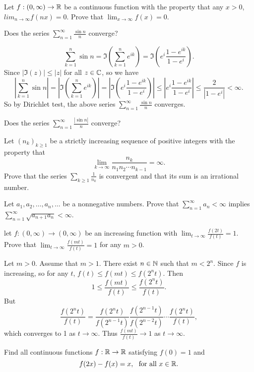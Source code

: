 \question[P\&B, 351] Let $f:(0,\infty)\to\mathbb{R}$ be a continuous function with the property that any $x>0$, $lim_{n\to\infty}{f(nx)}=0$. Prove that $\lim_{x\to\infty}{f(x)}=0$.

\question Does the series $\sum_{n=1}^{\infty}{\frac{\sin{n}}{n}}$ converge?

\begin{solution}
    $$\sum_{k=1}^{n}{\sin{n}}=\Im{\left(\sum_{k=1}^{n}{e^{ik}}\right)}=\Im{\left(e^i\frac{1-e^{ik}}{1-e^i}\right)}.$$
    Since $|\Im{(z)}|\leq|z|$ for all $z\in\mathbb{C}$, so we have
    $$\left|\sum_{k=1}^{n}{\sin{n}}\right|=\left|\Im{\left(\sum_{k=1}^{n}{e^{ik}}\right)}\right|=\left|\Im{\left(e^i\frac{1-e^{ik}}{1-e^i}\right)}\right|\leq \left|e^i\frac{1-e^{ik}}{1-e^i}\right|\leq\frac{2}{|1-e^i|}<\infty.$$
    So by Dirichlet test, the above series $\sum_{n=1}^{\infty}{\frac{\sin{n}}{n}}$ converges.
\end{solution}
\question Does the series $\sum_{n=1}^{\infty}{\frac{|\sin{n}|}{n}}$ converge?

\question Let $(n_k)_{k\geq 1}$ be a strictly increasing sequence of positive integers with the property that $$\lim_{k\to\infty}{\frac{n_k}{n_1n_2\cdots n_{k-1}}}=\infty.$$ Prove that the series $\sum_{k\geq 1}{\frac{1}{n_k}}$ is convergent and that its sum is an irrational number.

\question Let $a_1, a_2,\ldots, a_n, \ldots$ be a nonnegative numbers. Prove that $\sum_{n=1}^{\infty}{a_n}<\infty$ implies\\ $\sum_{n=1}^{\infty}{\sqrt{a_{n+1}a_n}}<\infty$.

\question[P\&B, 384] let $f:(0,\infty)\to(0,\infty)$ be an increasing function with $\lim_{t\to\infty}{\frac{f(2t)}{f(t)}}=1$. Prove that $\lim_{t\to\infty}{\frac{f(mt)}{f(t)}}=1$ for any $m>0$.

\begin{solution}
    Let $m>0$. Assume that $m>1$. There exist $n\in\mathbb{N}$ such that $m<2^n$. Since $f$ is increasing, so for any $t$, $f(t)\leq f(mt)\leq f(2^nt)$. Then
    $$1 \leq \frac{f(mt)}{f(t)}\leq \frac{f(2^nt)}{f(t)}.$$
    But
    $$\frac{f(2^nt)}{f(t)}=\frac{f(2^nt)}{f(2^{n-1}t)}\frac{f(2^{n-1}t)}{f(2^{n-2}t)}\cdots\frac{f(2^nt)}{f(t)},$$
    which converges to 1 as $t\to\infty$. Thus $\frac{f(mt)}{f(t)}\to 1$ as $t\to\infty$.
\end{solution}

\question Find all continuous functions $f:\mathbb{R}\to\mathbb{R}$ satisfying $f(0)=1$ and $$f(2x)-f(x)=x,\,\,\,\,\text{for all}\,\, x\in\mathbb{R}.$$


